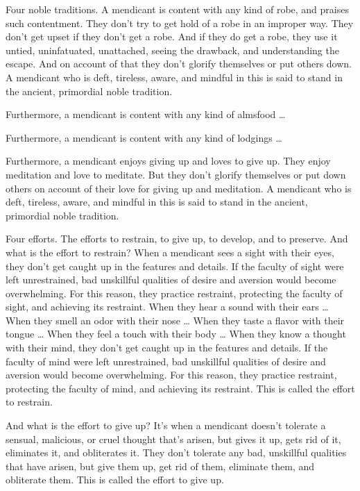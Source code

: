 \documentclass[12pt,openany]{book}%
\begin{document}
Four noble traditions. A mendicant is content with any kind of robe, and praises such contentment. They don’t try to get hold of a robe in an improper way. They don’t get upset if they don’t get a robe. And if they do get a robe, they use it untied, uninfatuated, unattached, seeing the drawback, and understanding the escape. And on account of that they don’t glorify themselves or put others down. A mendicant who is deft, tireless, aware, and mindful in this is said to stand in the ancient, primordial noble tradition. 

Furthermore, a mendicant is content with any kind of almsfood … 

Furthermore, a mendicant is content with any kind of lodgings … 

Furthermore, a mendicant enjoys giving up and loves to give up. They enjoy meditation and love to meditate. But they don’t glorify themselves or put down others on account of their love for giving up and meditation. A mendicant who is deft, tireless, aware, and mindful in this is said to stand in the ancient, primordial noble tradition. 

Four efforts. The efforts to restrain, to give up, to develop, and to preserve. And what is the effort to restrain? When a mendicant sees a sight with their eyes, they don’t get caught up in the features and details. If the faculty of sight were left unrestrained, bad unskillful qualities of desire and aversion would become overwhelming. For this reason, they practice restraint, protecting the faculty of sight, and achieving its restraint. When they hear a sound with their ears … When they smell an odor with their nose … When they taste a flavor with their tongue … When they feel a touch with their body … When they know a thought with their mind, they don’t get caught up in the features and details. If the faculty of mind were left unrestrained, bad unskillful qualities of desire and aversion would become overwhelming. For this reason, they practice restraint, protecting the faculty of mind, and achieving its restraint. This is called the effort to restrain. 

And what is the effort to give up? It’s when a mendicant doesn’t tolerate a sensual, malicious, or cruel thought that’s arisen, but gives it up, gets rid of it, eliminates it, and obliterates it. They don’t tolerate any bad, unskillful qualities that have arisen, but give them up, get rid of them, eliminate them, and obliterate them. This is called the effort to give up. 
\end{document}
